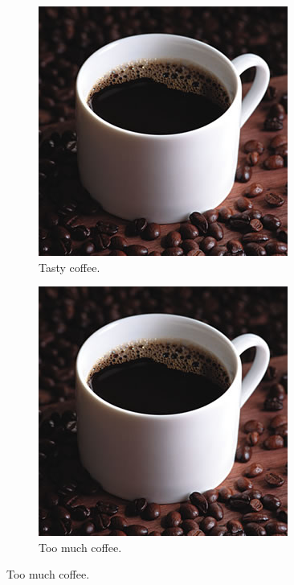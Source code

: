 \begin{figure}[ht!]
	\centering
	\caption{The same cup of coffee. Again.}
	\begin{subfigure}[b]{0.2\linewidth}
		\includegraphics[width=\linewidth]{2-textuais/figs/coffee.jpg}
		\caption{Tasty coffee.}
	\end{subfigure}
    \begin{subfigure}[b]{0.6\linewidth}
		\includegraphics[width=\linewidth]{2-textuais/figs/coffee.jpg}
		\caption{Too much coffee.}
	\end{subfigure}
	\label{fig:coffee2}
\end{figure}

